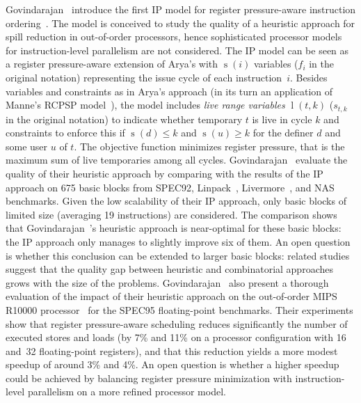 \documentclass[acmsmall,authorversion,nonacm]{acmart}
\newcommand{\noMathVar}[2]{\operatorname{#1}(#2)}
\newcommand{\var}[2]{$\noMathVar{#1}{#2}$}
\begin{document}
Govindarajan~\etal{} introduce the first IP model for register
pressure-aware instruction ordering~\cite{Govindarajan2003}.
The model is conceived to study the quality of a heuristic approach
for spill reduction in out-of-order processors, hence sophisticated
processor models for instruction-level parallelism are not considered.
The IP model can be seen as a register pressure-aware extension of
Arya's with \var{s}{i} variables ($f_i$ in the original notation)
representing the issue cycle of each instruction~$i$.
Besides variables and constraints as in Arya's approach (in its turn
an application of Manne's RCPSP model~\cite{Manne1960}), the model
includes \emph{live range variables} \var{l}{t,k} ($s_{t,k}$ in the
original notation) to indicate whether temporary $t$ is live in cycle
$k$ and constraints to enforce this if $\noMathVar{s}{d} \le k$ and
$\noMathVar{s}{u} \ge k$ for the definer $d$ and some user $u$ of $t$.
The objective function minimizes register pressure, that is the
maximum sum of live temporaries among all cycles.
Govindarajan~\etal{} evaluate the quality of their heuristic approach
by comparing with the results of the IP approach on 675 basic blocks
from SPEC92, Linpack~\cite{Dongarra2003},
Livermore~\cite{McMahon1986}, and NAS~\cite{Bailey1985} benchmarks.
Given the low scalability of their IP approach, only basic blocks of
limited size (averaging 19 instructions) are considered.
The comparison shows that Govindarajan~\etal{}'s heuristic approach is
near-optimal for these basic blocks: the IP approach only manages to
slightly improve six of them.
An open question is whether this conclusion can be extended to larger
basic blocks: related
studies~\cite{Wilken2000,Malik2008,Eriksson2011,Shobaki2013} suggest
that the quality gap between heuristic and combinatorial approaches
grows with the size of the problems.
Govindarajan~\etal{} also present a thorough evaluation of the impact
of their heuristic approach on the out-of-order MIPS R10000
processor~\cite{Yeager1996} for the SPEC95 floating-point benchmarks.
Their experiments show that register pressure-aware scheduling reduces
significantly the number of executed stores and loads (by 7\% and 11\%
on a processor configuration with 16 and~32 floating-point registers),
and that this reduction yields a more modest speedup of around 3\% and
4\%.
An open question is whether a higher speedup could be achieved by
balancing register pressure minimization with instruction-level
parallelism on a more refined processor model.
\end{document}

